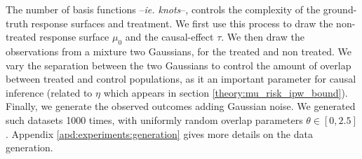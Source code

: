 \documentclass[10pt]{article}
\begin{document}
\begin{multicols}{2}
    The number of basis functions --\emph{ie. knots}--, controls the complexity of
    the ground-truth response surfaces and treatment. We first use this process to
    draw the non-treated response surface $\mu_0$ and the causal-effect $\tau$. We
    then draw the observations from a mixture two Gaussians, for the treated and non
    treated. We vary the separation between the two Gaussians to control the amount
    of overlap between treated and control populations, as it an important parameter
    for causal inference (related to $\eta$ which appears in section
    \ref{theory:mu_risk_ipw_bound}). Finally, we generate the observed outcomes
    adding Gaussian noise. We generated such datasets 1000 times, with
    uniformly random overlap parameters $\theta \in \left[ 0, 2.5 \right]$. Appendix
    \ref{apd:experiments:generation} gives more details on the data generation.



\end{multicols}
\end{document}
